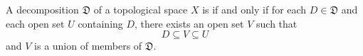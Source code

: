A decomposition $\mathfrak{D}$ of a topological space $X$ is  if and only if for each $D \in \mathfrak{D}$ and each open set $U$ containing $D$, there exists an open set $V$ such that
$$D \subseteq V \subseteq U$$
and $V$ is a union of members of $\mathfrak{D}$.
